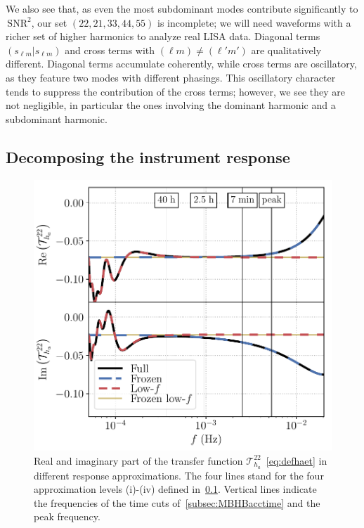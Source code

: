 \documentclass[aps,showpacs,twocolumn,prd,superscriptaddress,nofootinbib]{revtex4-1}
\newcommand\calT{{\mathcal{T}}}
\newcommand{\SNR}{\,\mathrm{SNR}}
\begin{document}
We also see that, as even the most subdominant modes contribute significantly to $\SNR^{2}$, our set $(22, 21, 33, 44, 55)$ is incomplete; we will need waveforms with a richer set of higher harmonics to analyze real LISA data. Diagonal terms $(s_{\ell m} | s_{\ell m})$ and cross terms with $(\ell m) \neq (\ell' m')$ are qualitatively different. Diagonal terms accumulate coherently, while cross terms are oscillatory, as they feature two modes with different phasings. This oscillatory character tends to suppress the contribution of the cross terms; however, we see they are not negligible, in particular the ones involving the dominant harmonic and a subdominant harmonic. 


\subsection{Decomposing the instrument response}
\label{subsec:MBHBresponseapprox}

\begin{figure}
  \centering
  \includegraphics[width=.98\linewidth]{../plots/responseapprox_tdia_22.pdf}
  \caption{Real and imaginary part of the transfer function $\calT^{22}_{h_{a}}$~\eqref{eq:defhaet} in different response approximations. The four lines stand for the four approximation levels (i)-(iv) defined in~\ref{subsec:MBHBresponseapprox}. Vertical lines indicate the frequencies of the time cuts of~\ref{subsec:MBHBacctime} and the peak frequency.}
  \label{fig:responseapproxtdia22}
\end{figure}
\end{document}
